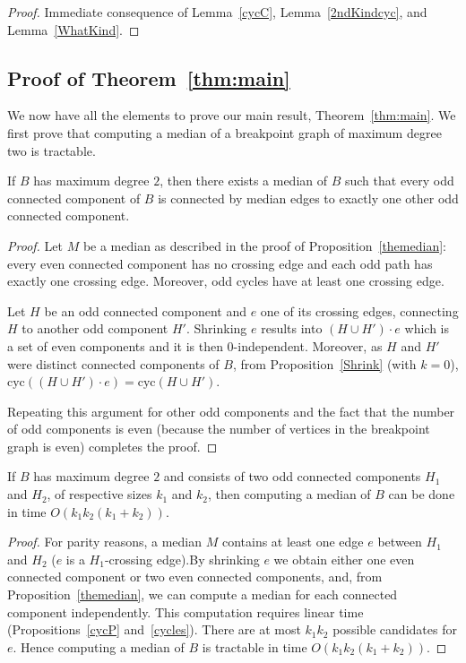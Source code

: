 \documentclass[10pt]{llncs}
\begin{document}
\begin{proof}
  Immediate consequence of Lemma~\ref{cycC}, Lemma~\ref{2ndKindcyc},
  and Lemma~\ref{WhatKind}.\end{proof}


\subsection{Proof of Theorem~\ref{thm:main}}

We now have all the elements to prove our main result,
Theorem~\ref{thm:main}. We first prove that computing a median of a
breakpoint graph of maximum degree two is tractable.

\begin{lemma}\label{linkage}
  If $B$ has maximum degree $2$, then there exists a median of $B$ such
  that every odd connected component of $B$ is connected by median
  edges to exactly one other odd connected component.
\end{lemma}

\begin{proof}
  Let $M$ be a median as described in the proof of
  Proposition~\ref{themedian}: every even connected component has no
  crossing edge and each odd path has exactly one crossing
  edge. Moreover, odd cycles have at least one crossing edge.

  Let $H$ be an odd connected component and $e$ one of its crossing
  edges, connecting $H$ to another odd component $H'$. Shrinking $e$
  results into $(H \cup H')\cdot e$ which is a set of even components
  and it is then $0$-independent. Moreover, as $H$ and $H'$ were
  distinct connected components of $B$, from Proposition~\ref{Shrink}
  (with $k=0$), $\text{cyc}((H \cup H')\cdot e)=\text{cyc}(H \cup
  H')$. 

  Repeating this argument for other odd components and the fact that
  the number of odd components is even (because the number of vertices
  in the breakpoint graph is even) completes the proof. \end{proof}


\begin{lemma}\label{pair}
  If $B$ has maximum degree $2$ and consists of two odd connected
  components $H_1$ and $H_2$, of respective sizes $k_1$ and $k_2$,
  then computing a median of $B$ can be done in time $O(k_1k_2(k_1+k_2))$.
\end{lemma}

\begin{proof}
    For parity reasons, a median $M$ contains at least one edge $e$
    between $H_1$ and $H_2$ ($e$ is a $H_1$-crossing edge).By shrinking $e$ we obtain either one even connected component or
    two even connected components, and, from
    Proposition~\ref{themedian}, we can compute a median for each
    connected component independently. This computation requires
    linear time (Propositions~\ref{cycP} and~\ref{cycles}). There are
    at most $k_1k_2$ possible candidates for
    $e$. Hence computing a median of $B$ is tractable in time
    $O(k_1k_2(k_1+k_2))$. \end{proof}
\end{document}
